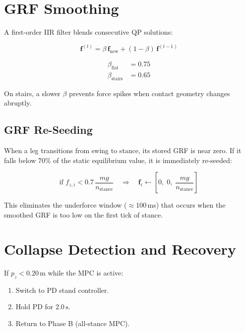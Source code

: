\documentclass[12pt,a4paper]{report}
\newcommand{\vect}[1]{\bm{#1}}
\begin{document}
\section{GRF Smoothing}
\label{sec:grf_smooth}

A first-order IIR filter blends consecutive QP solutions:

\begin{equation}
    \vect{f}^{(t)} = \beta\,\vect{f}_\text{new} + (1 - \beta)\,\vect{f}^{(t-1)}
\end{equation}

\begin{align}
    \beta_\text{flat}  &= 0.75 \\
    \beta_\text{stairs}&= 0.65
\end{align}

On stairs, a slower $\beta$ prevents force spikes when contact geometry
changes abruptly.

\subsection{GRF Re-Seeding}

When a leg transitions from swing to stance, its stored GRF is near zero.
If it falls below 70\% of the static equilibrium value, it is immediately
re-seeded:

\begin{equation}
    \text{if } f_{z,i} < 0.7\,\frac{mg}{n_\text{stance}} \quad
    \Rightarrow\quad \vect{f}_i \leftarrow \left[0,\;0,\;\frac{mg}{n_\text{stance}}\right]
\end{equation}

This eliminates the underforce window ($\approx$100\,ms) that occurs when
the smoothed GRF is too low on the first tick of stance.

\section{Collapse Detection and Recovery}

If $p_z < 0.20\,\text{m}$ while the MPC is active:
\begin{enumerate}[noitemsep]
  \item Switch to PD stand controller.
  \item Hold PD for $2.0\,\text{s}$.
  \item Return to Phase B (all-stance MPC).
\end{enumerate}

\end{document}
